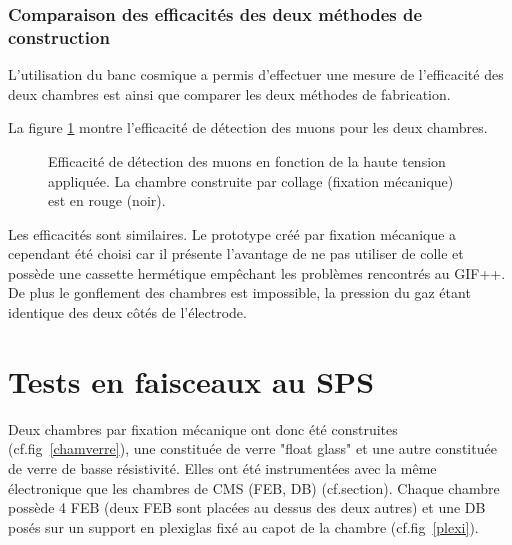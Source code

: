  \subsubsection{Comparaison des efficacités des deux méthodes de construction}
L'utilisation du banc cosmique a permis d'effectuer une mesure de l'efficacité des deux chambres est ainsi que comparer les deux méthodes de fabrication.

La figure \ref{comparaison2} montre l'efficacité de détection des muons pour les deux chambres.

\begin{figure}[!ht]
	\centering
	\scalebox{1.3}{}
	\caption{Efficacité de détection des muons en fonction de la haute tension appliquée. La chambre construite par collage (fixation mécanique) est en rouge (noir).}
	\label{comparaison2}
\end{figure}

Les efficacités sont similaires. Le prototype créé par fixation mécanique a cependant été choisi car il présente l'avantage de ne pas utiliser de colle et possède une cassette hermétique empêchant les problèmes rencontrés au GIF++. De plus le gonflement des chambres est impossible, la pression du gaz étant identique des deux côtés de l'électrode.

\section{Tests en faisceaux au SPS}
Deux chambres par fixation mécanique ont donc été construites (cf.fig~\ref{chamverre}), une constituée de verre "float glass" et une autre constituée de verre de basse résistivité. Elles ont été instrumentées avec la même électronique que les chambres de CMS (FEB, DB) (cf.section\label{cmselec}). Chaque chambre possède \num{4} FEB (deux FEB sont placées au dessus des deux autres) et une DB posés sur un support en plexiglas fixé au capot de la chambre (cf.fig~\ref{plexi}).

